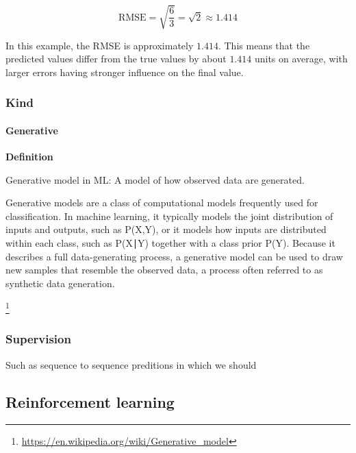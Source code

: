 \documentclass{book}
\providecommand{\ProjectDeepHeading}[2]{%
    \par\medskip\noindent\textbf{#2}\par\smallskip
}
\providecommand{\seeherefooter}[1]{\footnote{\url{#1}}}
\begin{document}
    \[
        \mathrm{RMSE}
        =
        \sqrt{
            \frac{6}{3}
        }
        =
        \sqrt{2}
        \approx 1.414
    \]
    
    In this example, the RMSE is approximately \(1.414\). This means that the predicted values differ from the true values by about \(1.414\) units on average, with larger errors having stronger influence on the final value.
%    
%

\subsubsection{Kind}

\paragraph{Generative}


\ProjectDeepHeading{2}{Definition}
      Generative model in ML:
      A model of how observed data are generated.

      Generative models are a class of computational models frequently used for classification. In machine learning, it typically models the joint distribution of inputs and outputs, such as P(X,Y), or it models how inputs are distributed within each class, such as P(X∣Y) together with a class prior P(Y). Because it describes a full data-generating process, a generative model can be used to draw new samples that resemble the observed data, a process often referred to as synthetic data generation.

      \seeherefooter{https://en.wikipedia.org/wiki/Generative_model}

\subsubsection{Supervision}


Such as sequence to sequence preditions in which we should

\subsection{Reinforcement learning}

\end{document}
